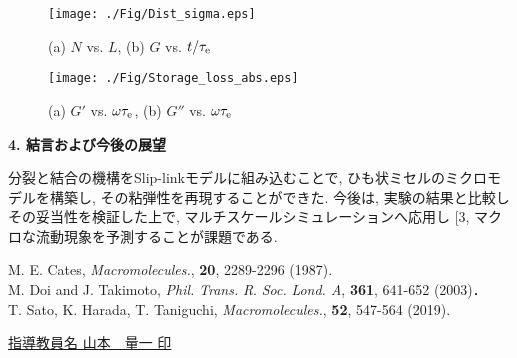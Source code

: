 \documentclass[twocolumns,10pt,a4j]{jarticle}
\makeatletter
\DeclareRobustCommand\cite{\unskip
  \@ifnextchar[{\@tempswatrue\@citex}{\@tempswafalse\@citex[]}}
\makeatother
\begin{document}
      \vspace{-4truemm}
      \begin{figure}[H]
	\hspace{-2truemm}
	  \texttt{[image: ./Fig/Dist\_sigma.eps]}\vspace{-6truemm}
	  \caption{(a) $N$ vs. $L$, (b) $G$ vs. $t/\tau_{\rm e}$}
        \label{Dist_sigma}
      \end{figure}

      \vspace{-7.5truemm}
      \begin{figure}[H]
	\hspace{-3truemm}
	  \texttt{[image: ./Fig/Storage\_loss\_abs.eps]}\vspace{-6truemm}
	\caption{(a) $G'$ vs. $\omega\tau_{\rm e}$, (b) $G''$ vs. $\omega\tau_{\rm e}$}
        \label{Storage_loss}
      \end{figure}
      \vspace{-3.5truemm}


      \noindent
      {\bf \large 4. 結言および今後の展望}
      \par 
      分裂と結合の機構をSlip-linkモデルに組み込むことで, ひも状ミセルのミクロモデルを構築し, その粘弾性を再現することができた. 今後は, 実験の結果と比較しその妥当性を検証した上で, マルチスケールシミュレーションへ応用し\cite{3}, マクロな流動現象を予測することが課題である.  
      \vspace{-7.5truemm}
      \renewcommand{\refname}{\large 参考文献\vspace{-3truemm}}
      \begin{thebibliography}{9}
        M. E. Cates, \textit{Macromolecules.}, \textbf{20}, 2289-2296 (1987). \\
      \vspace{-7truemm}
        M. Doi and J. Takimoto, \textit{Phil.} \textit{Trans.} \textit{R}. \textit{Soc.} \textit{Lond. A}, \textbf{361}, 641-652 (2003)．\\
      \vspace{-7truemm}
        T. Sato, K. Harada, T. Taniguchi,  \textit{Macromolecules.}, \textbf{52}, 547-564 (2019). \\
      \end{thebibliography}
      \vspace{-7truemm}
      \centering
      \underline{指導教員名\hspace{10truemm} 山本　量一 \hspace{20truemm} 印}

  
\end{document}

